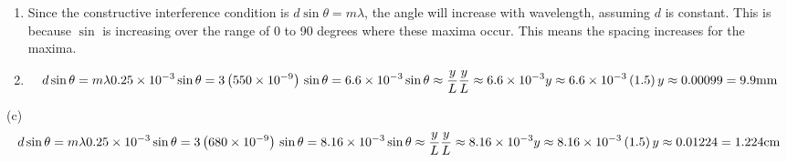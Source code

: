 \documentclass[11pt]{article}
\begin{document}
\begin{enumerate}
\def\labelenumi{(\alph{enumi})}
\item
  Since the constructive interference condition is
  \(d \sin\theta = m\lambda\), the angle will increase with wavelength,
  assuming \(d\) is constant. This is because \(\sin\) is increasing
  over the range of 0 to 90 degrees where these maxima occur. This means
  the spacing increases for the maxima.
\item
  \[d\begin{equation}
  \sin\theta = m\lambda\\
  0.25\times10^{-3} \sin\theta = 3\left(550\times10^{-9}\right)\\
  \sin\theta = 6.6\times10^{-3}\\
  \sin\theta \approx \frac{y}{L}\\
  \frac{y}{L} \approx 6.6\times10^{-3}\\
  y\approx 6.6\times10^{-3}\left(1.5\right)\\
  y\approx 0.00099 = 9.9 \rm{mm}
  \end{equation}\]
\end{enumerate}

(c)\[d\begin{equation}
\sin\theta = m\lambda\\
0.25\times10^{-3} \sin\theta = 3\left(680\times10^{-9}\right)\\
\sin\theta = 8.16\times10^{-3}\\
\sin\theta \approx \frac{y}{L}\\
\frac{y}{L} \approx 8.16\times10^{-3}\\
y\approx 8.16\times10^{-3}\left(1.5\right)\\
y\approx 0.01224 = 1.224 \rm{cm}
\end{equation}\]
\end{document}
